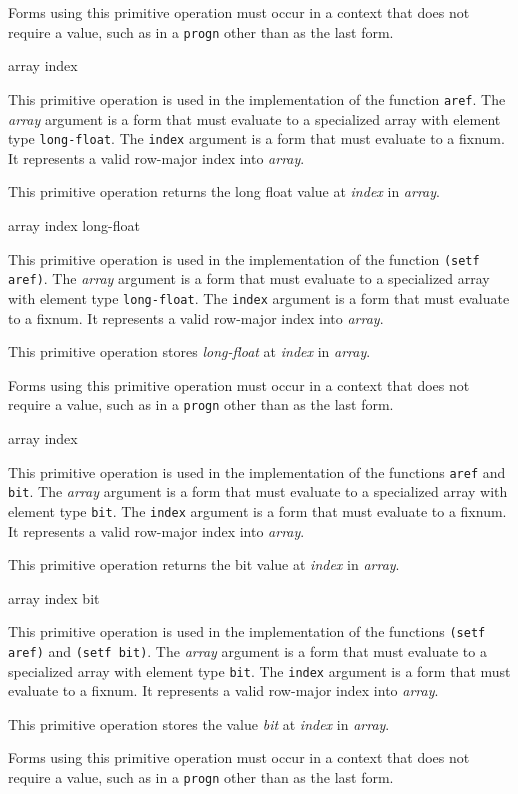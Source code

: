 Forms using this primitive operation must occur in a context that does
not require a value, such as in a \texttt{progn} other than as the
last form.

 {array index}

This primitive operation is used in the implementation of the
\commonlisp{} function \texttt{aref}.  The \textit{array} argument is
a form that must evaluate to a specialized array with element type
\texttt{long-float}.  The \texttt{index} argument is a form that must
evaluate to a fixnum.  It represents a valid row-major index into
\textit{array}.

This primitive operation returns the long float value at
\textit{index} in \textit{array}.

 {array index long-float}

This primitive operation is used in the implementation of the
\commonlisp{} function \texttt{(setf aref)}.  The \textit{array}
argument is a form that must evaluate to a specialized array with
element type \texttt{long-float}.  The \texttt{index} argument is a
form that must evaluate to a fixnum.  It represents a valid row-major
index into \textit{array}.

This primitive operation stores \textit{long-float} at \textit{index}
in \textit{array}.

Forms using this primitive operation must occur in a context that does
not require a value, such as in a \texttt{progn} other than as the
last form.

 {array index}

This primitive operation is used in the implementation of the
\commonlisp{} functions \texttt{aref} and \texttt{bit}.  The
\textit{array} argument is a form that must evaluate to a specialized
array with element type \texttt{bit}.  The \texttt{index} argument is
a form that must evaluate to a fixnum.  It represents a valid
row-major index into \textit{array}.

This primitive operation returns the bit value at \textit{index} in
\textit{array}.

 {array index bit}

This primitive operation is used in the implementation of the
\commonlisp{} functions \texttt{(setf aref)} and \texttt{(setf bit)}.
The \textit{array} argument is a form that must evaluate to a
specialized array with element type \texttt{bit}.  The \texttt{index}
argument is a form that must evaluate to a fixnum.  It represents a
valid row-major index into \textit{array}.

This primitive operation stores the value \textit{bit} at
\textit{index} in \textit{array}.

Forms using this primitive operation must occur in a context that does
not require a value, such as in a \texttt{progn} other than as the
last form.
